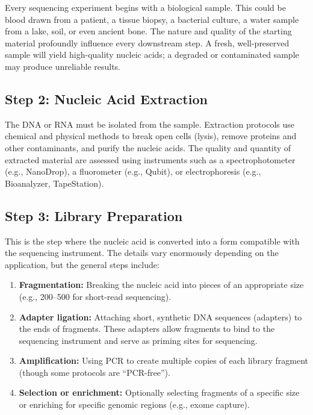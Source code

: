 Every sequencing experiment begins with a biological sample. This could be blood drawn from a patient, a tissue biopsy, a bacterial culture, a water sample from a lake, soil, or even ancient bone. The nature and quality of the starting material profoundly influence every downstream step. A fresh, well-preserved sample will yield high-quality nucleic acids; a degraded or contaminated sample may produce unreliable results.

\subsection{Step 2: Nucleic Acid Extraction}
\label{subsec:intro:extraction}

The DNA or RNA must be isolated from the sample. Extraction protocols use chemical and physical methods to break open cells (lysis), remove proteins and other contaminants, and purify the nucleic acids. The quality and quantity of extracted material are assessed using instruments such as a spectrophotometer (e.g., NanoDrop), a fluorometer (e.g., Qubit), or electrophoresis (e.g., Bioanalyzer, TapeStation).

\subsection{Step 3: Library Preparation}
\label{subsec:intro:library-prep}

This is the step where the nucleic acid is converted into a form compatible with the sequencing instrument. The details vary enormously depending on the application, but the general steps include:

\begin{enumerate}[itemsep=2pt]
  \item \textbf{Fragmentation:} Breaking the nucleic acid into pieces of an appropriate size (e.g., 200--500\basepair{} for short-read sequencing).
  \item \textbf{Adapter ligation:} Attaching short, synthetic DNA sequences (adapters) to the ends of fragments. These adapters allow fragments to bind to the sequencing instrument and serve as priming sites for sequencing.
  \item \textbf{Amplification:} Using \acrfull{PCR} to create multiple copies of each library fragment (though some protocols are ``PCR-free'').
  \item \textbf{Selection or enrichment:} Optionally selecting fragments of a specific size or enriching for specific genomic regions (e.g., exome capture).
\end{enumerate}

